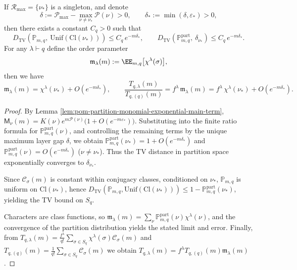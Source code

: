 \begin{theorem}\label{thm:pom-symmetric-group-gibbs-freezing}
If \(\mathcal{R}_{\max}=\{\nu_*\}\) is a singleton, and denote
\[
\delta:=\mathcal{P}_{\max}-\max_{\nu\neq\nu_*}\mathcal{P}(\nu)>0,
\qquad
\delta_*:=\min(\delta,\varepsilon_*)>0,
\]
then there exists a constant \(C_q>0\) such that
\[
D_{\mathrm{TV}}\!\left(\mathbb P_{m,q},\ \mathrm{Unif}(\mathrm{Cl}(\nu_*))\right)\le C_q\,e^{-m\delta_*},
\qquad
D_{\mathrm{TV}}\!\left(\mathbb P_{m,q}^{\mathrm{part}},\ \delta_{\nu_*}\right)\le C_q\,e^{-m\delta_*}.
\]
For any \(\lambda\vdash q\) define the order parameter
\[
\mathfrak m_\lambda(m):=\EE_{m,q}\bigl[\chi^\lambda(\sigma)\bigr],
\]
then we have
\[
\mathfrak m_\lambda(m)=\chi^\lambda(\nu_*)+O(e^{-m\delta_*}),
\qquad
\frac{T_{q,\lambda}(m)}{T_{q,(q)}(m)}=f^\lambda\,\mathfrak m_\lambda(m)
=f^\lambda\,\chi^\lambda(\nu_*)+O(e^{-m\delta_*}).
\]
\end{theorem}
\begin{proof}
By Lemma \ref{lem:pom-partition-monomial-exponential-main-term},
\(
\mathsf{M}_\nu(m)=K(\nu)e^{m\mathcal{P}(\nu)}\bigl(1+O(e^{-m\varepsilon_*})\bigr)
\).
Substituting into the finite ratio formula for \(\mathbb P_{m,q}^{\mathrm{part}}(\nu)\), and controlling the remaining terms by the unique maximum layer gap \(\delta\), we obtain
\(
\mathbb P_{m,q}^{\mathrm{part}}(\nu_*)=1+O(e^{-m\delta_*})
\)
and \(\mathbb P_{m,q}^{\mathrm{part}}(\nu)=O(e^{-m\delta_*})\) (\(\nu\neq\nu_*\)).
Thus the TV distance in partition space exponentially converges to \(\delta_{\nu_*}\).
\par
Since \(\mathcal{C}_\sigma(m)\) is constant within conjugacy classes, conditioned on \(\nu_*\), \(\mathbb P_{m,q}\) is uniform on \(\mathrm{Cl}(\nu_*)\),
hence
\(
D_{\mathrm{TV}}(\mathbb P_{m,q},\mathrm{Unif}(\mathrm{Cl}(\nu_*)))\le 1-\mathbb P_{m,q}^{\mathrm{part}}(\nu_*)
\),
yielding the TV bound on \(S_q\).
\par
Characters are class functions, so \(\mathfrak m_\lambda(m)=\sum_{\nu}\mathbb P_{m,q}^{\mathrm{part}}(\nu)\chi^\lambda(\nu)\), and the convergence of the partition distribution yields the stated limit and error.
Finally, from
\(
T_{q,\lambda}(m)=\frac{f^\lambda}{q!}\sum_{\sigma\in S_q}\chi^\lambda(\sigma)\mathcal{C}_\sigma(m)
\)
and
\(
T_{q,(q)}(m)=\frac{1}{q!}\sum_{\sigma\in S_q}\mathcal{C}_\sigma(m)
\)
we obtain \(T_{q,\lambda}(m)=f^\lambda T_{q,(q)}(m)\mathfrak m_\lambda(m)\).
\end{proof}
